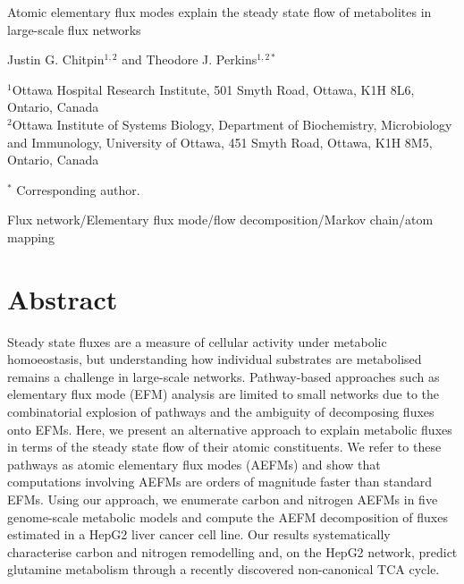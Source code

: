 \documentclass[12pt]{article}
\begin{document}
\begin{titlepage}
    \begin{center}
        \vspace*{1cm}

        {\Large Atomic elementary flux modes explain the steady state flow of
        metabolites in large-scale flux networks}

            
        \vspace{1.0cm}

        Justin G. Chitpin$^{1,2}$ and Theodore J. Perkins$^{1,2*}$

        \vspace{1.0cm}

        $^1$Ottawa Hospital Research Institute, 501 Smyth Road, Ottawa, K1H 8L6, Ontario, Canada\\
        $^2$Ottawa Institute of Systems Biology, Department of Biochemistry, Microbiology and Immunology, University of Ottawa, 451 Smyth Road, Ottawa, K1H 8M5, Ontario, Canada
           
        \vspace{0.5cm}

        $^*$ Corresponding author.

        \vspace{1.0cm}
     
        Flux network/Elementary flux mode/flow decomposition/Markov chain/atom mapping
            
   \end{center}
\end{titlepage}

\clearpage

\section*{Abstract} %

Steady state fluxes are a measure of cellular activity under metabolic
homoeostasis, but understanding how individual substrates are metabolised
remains a challenge in large-scale networks. Pathway-based approaches such
as elementary flux mode (EFM) analysis are limited to small networks due
to the combinatorial explosion of pathways and the ambiguity of
decomposing fluxes onto EFMs. Here, we present an alternative approach to
explain metabolic fluxes in terms of the steady state flow of their atomic
constituents. We refer to these pathways as atomic elementary flux modes
(AEFMs) and show that computations involving AEFMs are orders of magnitude
faster than standard EFMs. Using our approach, we enumerate carbon and
nitrogen AEFMs in five genome-scale metabolic models and compute the AEFM
decomposition of fluxes estimated in a HepG2 liver cancer cell line. Our
results systematically characterise carbon and nitrogen remodelling and,
on the HepG2 network, predict glutamine metabolism through a recently
discovered non-canonical TCA cycle.
\end{document}
